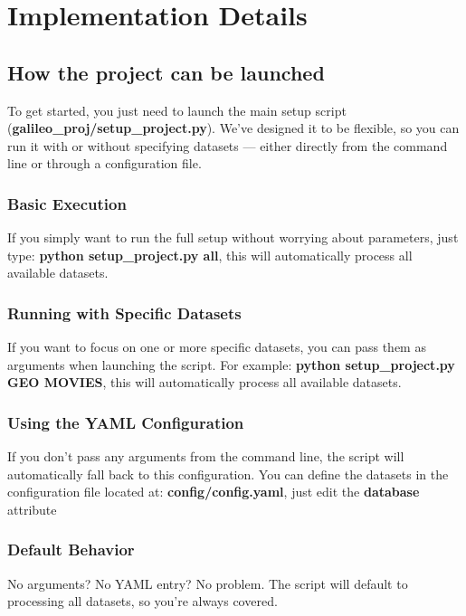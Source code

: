 \documentclass[12pt,a4paper]{article}
\begin{document}
\section{Implementation Details}

\subsection{How the project can be launched}
To get started, you just need to launch the main setup script (\textbf{galileo\_proj/setup\_project.py}). We’ve designed it to be flexible, so you can run it with or without specifying datasets — either directly from the command line or through a configuration file.
\subsubsection{Basic Execution}
If you simply want to run the full setup without worrying about parameters, just type: \textbf{python setup\_project.py all}, this will automatically process all available datasets.
\subsubsection{Running with Specific Datasets}
If you want to focus on one or more specific datasets, you can pass them as arguments when launching the script. For example: \textbf{python setup\_project.py GEO MOVIES}, this will automatically process all available datasets.
\subsubsection{Using the YAML Configuration}
If you don’t pass any arguments from the command line, the script will automatically fall back to this configuration.
You can define the datasets in the configuration file located at: \textbf{config/config.yaml}, just edit the \textbf{database} attribute
\subsubsection{Default Behavior}
No arguments? No YAML entry? No problem. The script will default to processing all datasets, so you’re always covered.
\end{document}
